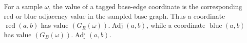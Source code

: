 \begin{definition}
For a sample \(\omega\), the value of a tagged base-edge coordinate is the
corresponding red or blue adjacency value in the sampled base graph.  Thus a
coordinate \(\operatorname{red}(a,b)\) has value
\((G_R(\omega)).\operatorname{Adj}(a,b)\), while a coordinate
\(\operatorname{blue}(a,b)\) has value
\((G_B(\omega)).\operatorname{Adj}(a,b)\).
\end{definition}
